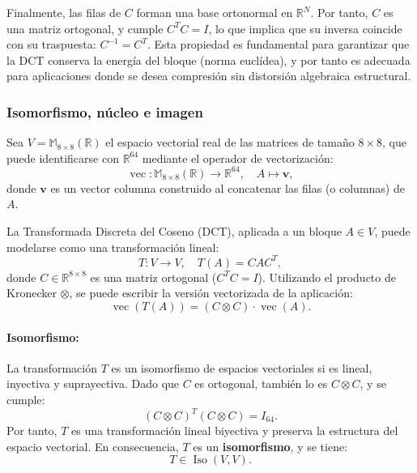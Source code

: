 \documentclass[8pt,a4paper]{article}
\theoremstyle{definition}
\theoremstyle{remark}
\begin{document}
\begin{multicols}{2}
            Finalmente, las filas de \( C \) forman una base ortonormal en \( \mathbb{R}^N \). Por tanto, \( C \) es una matriz ortogonal, y cumple \( C^T C = I \), lo que implica que su inversa coincide con su traspuesta: \( C^{-1} = C^T \). Esta propiedad es fundamental para garantizar que la DCT conserva la energía del bloque (norma euclídea), y por tanto es adecuada para aplicaciones donde se desea compresión sin distorsión algebraica estructural.
            
            \subsubsection{Isomorfismo, núcleo e imagen}

            Sea \( V = \mathbb{M}_{8 \times 8}(\mathbb{R}) \) el espacio vectorial real de las matrices de tamaño \( 8 \times 8 \), que puede identificarse con \( \mathbb{R}^{64} \) mediante el operador de vectorización:
            \[
            \operatorname{vec}: \mathbb{M}_{8 \times 8}(\mathbb{R}) \longrightarrow \mathbb{R}^{64}, \quad A \mapsto \mathbf{v},
            \]
            donde \( \mathbf{v} \) es un vector columna construido al concatenar las filas (o columnas) de \( A \).
            
            La Transformada Discreta del Coseno (DCT), aplicada a un bloque \( A \in V \), puede modelarse como una transformación lineal:
            \[
            T: V \to V, \quad T(A) = C A C^T,
            \]
            donde \( C \in \mathbb{R}^{8 \times 8} \) es una matriz ortogonal (\( C^T C = I \)). Utilizando el producto de Kronecker \( \otimes \), se puede escribir la versión vectorizada de la aplicación:
            \[
            \operatorname{vec}(T(A)) = (C \otimes C) \cdot \operatorname{vec}(A).
            \]
            
            \paragraph{Isomorfismo:}
            La transformación \( T \) es un isomorfismo de espacios vectoriales si es lineal, inyectiva y suprayectiva. Dado que \( C \) es ortogonal, también lo es \( C \otimes C \), y se cumple:
            \[
            (C \otimes C)^T (C \otimes C) = I_{64}.
            \]
            Por tanto, \( T \) es una transformación lineal biyectiva y preserva la estructura del espacio vectorial. En consecuencia, \( T \) es un \textbf{isomorfismo}, y se tiene:
            \[
            T \in \operatorname{Iso}(V, V).
            \]
            

\end{multicols}
\end{document}
